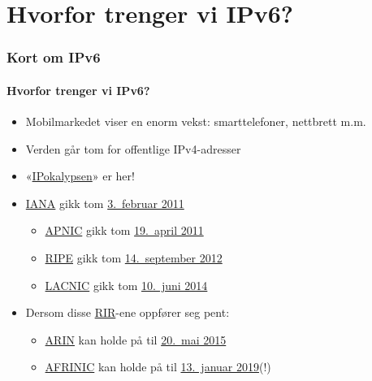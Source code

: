 \section{Hvorfor trenger vi IPv6?}
\begin{frame}%
  \frametitle{Kort om IPv6}
  \framesubtitle{Hvorfor trenger vi IPv6?}
  \pause
  \begin{itemize}[<+->]
  \item Mobilmarkedet viser en enorm vekst: smarttelefoner, nettbrett m.m.
  \item Verden går tom for offentlige IPv4-adresser
  \item
    «\href{http://www.potaroo.net/presentations/2012-05-22-terena.pdf}{IPokalypsen}»
    er her!
  \item \href{http://www.iana.org/}{IANA} gikk tom
    \href{http://www.icann.org/en/news/press/releases/release-03feb11-en.pdf}{3.~februar
      2011}
    \begin{itemize}[<+->]
    \item \href{http://www.apnic.net/}{APNIC} gikk tom
      \href{http://www.apnic.net/community/ipv4-exhaustion/graphical-information}{19.~april
        2011}
    \item \href{http://www.ripe.net/}{RIPE} gikk tom
      \href{http://www.ripe.net/internet-coordination/ipv4-exhaustion}{14.~september
        2012}
    \item \href{http://www.lacnic.net/en/web/lacnic/inicio}{LACNIC}
      gikk tom
      \href{http://www.lacnic.net/en/web/lacnic/agotamiento-ipv4}{10.~juni
        2014}
    \end{itemize}
  \item Dersom disse
    \href{http://en.wikipedia.org/wiki/Regional_Internet_registry}{RIR}-ene
    oppfører seg pent:
    \begin{itemize}
    \item \href{https://www.arin.net/}{ARIN} kan holde på til
      \href{http://www.potaroo.net/tools/ipv4/}{20.\ mai 2015}
    \item \href{http://www.afrinic.net/}{AFRINIC} kan holde på til
      \href{http://www.potaroo.net/tools/ipv4/}{13.\ januar 2019}(!)
    \end{itemize}
  \end{itemize}
\end{frame}

